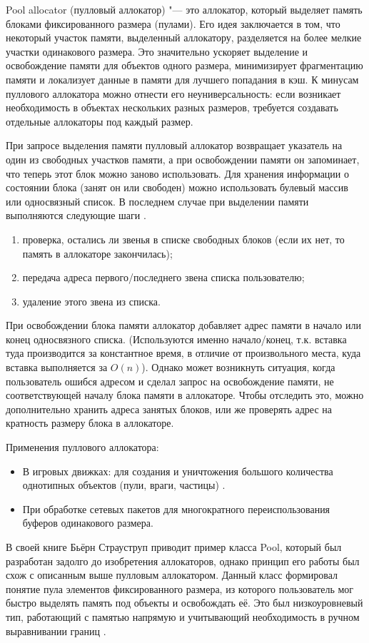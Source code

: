 Pool allocator (пулловый аллокатор) "--- это аллокатор, который выделяет память блоками фиксированного размера (пулами). Его идея заключается в том, что некоторый участок памяти, выделенный аллокатору, разделяется на более мелкие участки одинакового размера. Это значительно ускоряет выделение и освобождение памяти для объектов одного размера, минимизирует фрагментацию памяти и локализует данные в памяти для лучшего попадания в кэш. К минусам пуллового аллокатора можно отнести его неуниверсальность: если возникает необходимость в объектах нескольких разных размеров, требуется создавать отдельные аллокаторы под каждый размер.

При запросе выделения памяти пулловый аллокатор возвращает указатель на один из свободных участков памяти, а при освобождении памяти он запоминает, что теперь этот блок можно заново использовать. Для хранения информации о состоянии блока (занят он или свободен) можно использовать булевый массив или односвязный список. В последнем случае при выделении памяти выполняются следующие шаги \cite{allocators}.

\begin{enumerate}
	\item проверка, остались ли звенья в списке свободных блоков (если их нет, то память в аллокаторе закончилась);
	\item передача адреса первого/последнего звена списка пользователю;
	\item удаление этого звена из списка.
\end{enumerate}

При освобождении блока памяти аллокатор добавляет адрес памяти в начало или конец односвязного списка. (Используются именно начало/конец, т.к. вставка туда производится за константное время, в отличие от произвольного места, куда вставка выполняется за $O(n)$). Однако может возникнуть ситуация, когда пользователь ошибся адресом и сделал запрос на освобождение памяти, не соответствующей началу блока памяти в аллокаторе. Чтобы отследить это, можно дополнительно хранить адреса занятых блоков, или же проверять адрес на кратность размеру блока в аллокаторе.

Применения пуллового аллокатора:

\begin{itemize}
	\item В игровых движках: для создания и уничтожения большого количества однотипных объектов (пули, враги, частицы) \cite{game++}.
	\item При обработке сетевых пакетов для многократного переиспользования буферов одинакового размера.
\end{itemize}

В своей книге Бьёрн Страуструп приводит пример класса Pool, который был разработан задолго до изобретения аллокаторов, однако принцип его работы был схож с описанным выше пулловым аллокатором. Данный класс формировал понятие пула элементов фиксированного размера, из которого пользователь мог быстро выделять память под объекты и освобождать её. Это был низкоуровневый тип, работающий с памятью напрямую и учитывающий необходимость в ручном выравнивании границ \cite{straustrup}.
